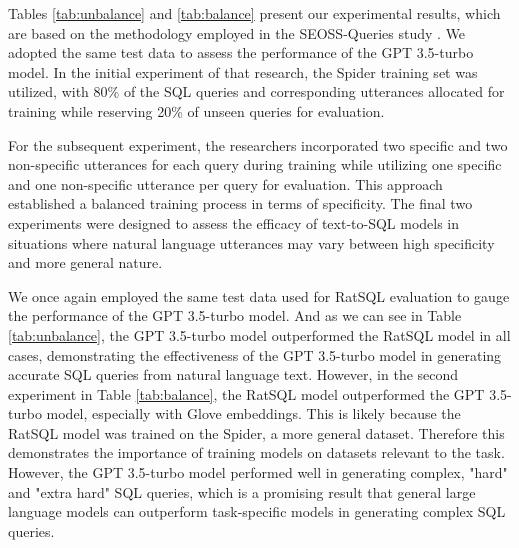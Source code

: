 Tables \ref{tab:unbalance} and \ref{tab:balance} present our experimental results, which are based on the methodology employed in the SEOSS-Queries study \cite{TOMOVA2022108211}. We adopted the same test data to assess the performance of the GPT 3.5-turbo model. In the initial experiment of that research, the Spider training set was utilized, with 80\% of the SQL queries and corresponding utterances allocated for training while reserving 20\% of unseen queries for evaluation.

For the subsequent experiment, the researchers incorporated two specific and two non-specific utterances for each query during training while utilizing one specific and one non-specific utterance per query for evaluation. This approach established a balanced training process in terms of specificity. The final two experiments were designed to assess the efficacy of text-to-SQL models in situations where natural language utterances may vary between high specificity and more general nature.

We once again employed the same test data used for RatSQL evaluation to gauge the performance of the GPT 3.5-turbo model. And as we can see in Table \ref{tab:unbalance}, the GPT 3.5-turbo model outperformed the RatSQL model in all cases, demonstrating the effectiveness of the GPT 3.5-turbo model in generating accurate SQL queries from natural language text. However, in the second experiment in Table \ref{tab:balance}, the RatSQL model outperformed the GPT 3.5-turbo model, especially with Glove embeddings. This is likely because the RatSQL model was trained on the Spider, a more general dataset. Therefore this demonstrates the importance of training models on datasets relevant to the task. However, the GPT 3.5-turbo model performed well in generating complex, "hard" and "extra hard" SQL queries, which is a promising result that general large language models can outperform task-specific models in generating complex SQL queries.